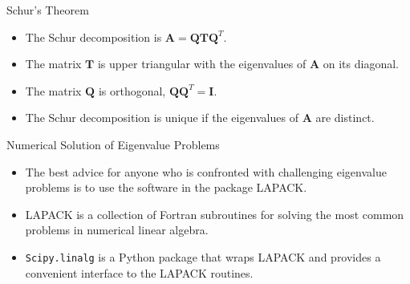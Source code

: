 \documentclass{beamer}
\begin{document}
\begin{frame}{Schur's Theorem}
    \begin{itemize}
        \item The Schur decomposition is $\mathbf{A}=\mathbf{Q} \mathbf{T} \mathbf{Q}^T$.
        \item The matrix $\mathbf{T}$ is upper triangular with the eigenvalues of $\mathbf{A}$ on its diagonal.
        \item The matrix $\mathbf{Q}$ is orthogonal, $\mathbf{Q} \mathbf{Q}^T=\mathbf{I}$.
        \item The Schur decomposition is unique if the eigenvalues of $\mathbf{A}$ are distinct.
    \end{itemize}
\end{frame}

\begin{frame}{Numerical Solution of Eigenvalue Problems}
    \begin{itemize}
        \item The best advice for anyone who is confronted with challenging eigenvalue problems is
        to use the software in the package LAPACK.
        \item LAPACK is a collection of Fortran subroutines for solving the most common problems in numerical linear algebra.
        \item \texttt{Scipy.linalg} is a Python package that wraps LAPACK and provides a convenient interface to the LAPACK routines.
    \end{itemize}
\end{frame}
\end{document}
